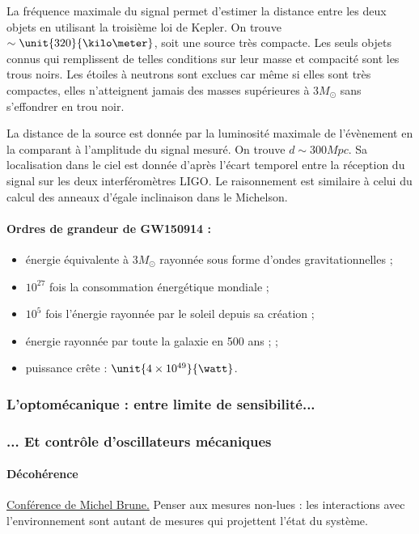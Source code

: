 \documentclass[12pt,a4paper]{article}
\begin{document}
La fréquence maximale du signal permet d'estimer la distance entre les deux objets en utilisant la troisième loi de Kepler.
On trouve $\sim \unit{320}{\kilo\meter}$, soit une source très compacte.
Les seuls objets connus qui remplissent de telles conditions sur leur masse et compacité sont les trous noirs.
Les étoiles à neutrons sont exclues car même si elles sont très compactes, elles n'atteignent jamais des masses supérieures à $\unit{3}{M_\odot}$ sans s'effondrer en trou noir.

La distance de la source est donnée par la luminosité maximale de l'évènement en la comparant à l'amplitude du signal mesuré.
On trouve $d \sim\unit{300}{Mpc}$.
Sa localisation dans le ciel est donnée d'après l'écart temporel entre la réception du signal sur les deux interféromètres LIGO.
Le raisonnement est similaire à celui du calcul des anneaux d'égale inclinaison dans le Michelson.

\paragraph{Ordres de grandeur de GW150914 :}
\begin{itemize}
\item énergie équivalente à $\unit{3}{M_\odot}$ rayonnée sous forme d'ondes gravitationnelles ;
\item $10^{27}$ fois la consommation énergétique mondiale ;
\item $10^5$ fois l'énergie rayonnée par le soleil depuis sa création ;
\item énergie rayonnée par toute la galaxie en 500 ans ;
;
\item puissance crête : $\unit{4\times10^{49}}{\watt}$.
\end{itemize}

\subsubsection{L'optomécanique : entre limite de sensibilité...}

\subsubsection{... Et contrôle d'oscillateurs mécaniques}

\paragraph{Décohérence\\}
\href{https://www.youtube.com/watch?v=rCCr77aX4ek}{Conférence de Michel Brune.}
Penser aux mesures non-lues : les interactions avec l'environnement sont autant de mesures qui projettent l'état du système.
\end{document}
